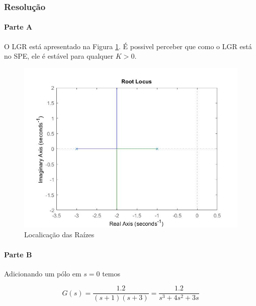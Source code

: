 \documentclass[
]{book}
\theoremstyle{definition}
\theoremstyle{definition}
\theoremstyle{definition}
\theoremstyle{remark}
\begin{document}
\hypertarget{resoluuxe7uxe3o-25}{%
\subsubsection*{Resolução}\label{resoluuxe7uxe3o-25}}

\hypertarget{parte-a-12}{%
\paragraph{Parte A}\label{parte-a-12}}

O LGR está apresentado na Figura \ref{fig:fig8R6}. É possivel perceber que como o LGR está no SPE, ele é estável para qualquer \(K > 0\).

\begin{figure}

{\centering \includegraphics{Imagens/Lab8/Resolução/fig6} 

}

\caption{Localicação das Raízes}\label{fig:fig8R6}
\end{figure}

\hypertarget{parte-b-11}{%
\paragraph{Parte B}\label{parte-b-11}}

Adicionando um pólo em \(s=0\) temos

\[
G(s) = \frac{1.2}{(s+1)(s+3)} = \frac{1.2}{s^3+4s^2+3s}
\]
\end{document}
